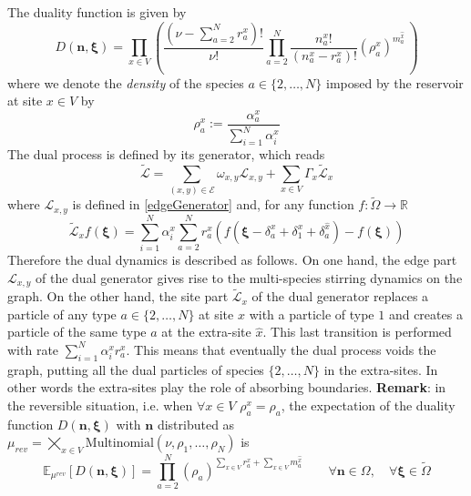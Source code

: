 \documentclass[11pt]{article}
\numberwithin{equation}{section}
\numberwithin{equation}{subsection}
\newcommand{\twoj}{\nu}
\begin{document}
The duality function is given by
\begin{equation}\label{dualityElements}
	D(\bm{n},\bm{\xi})=\prod_{x\in V}\left(\frac{(\nu -\sum_{a=2}^{N}r_{a}^{x})!}{\nu!}\prod_{a=2}^{N}\frac{n_{a}^{x}!}{(n_{a}^{x}-r_{a}^{x})!}\left(\rho_{a}^{x}\right)^{m_{a}^{\widehat{x}}}\,\right)
\end{equation}
where we denote the \textit{density} of the species $a\in \{2,\ldots,N\}$ imposed by the reservoir at site $x\in V$  by 
\begin{equation}
\rho_{a}^{x}:=\frac{\alpha_{a}^{x}}{\sum_{i=1}^{N}\alpha_{i}^{x}}
\end{equation}
The dual process is defined by its generator, which reads
 \begin{equation}\label{DualGenerator}
    \widetilde{\mathcal{L}}=\sum_{(x,y)\in \mathcal{E}}\omega_{x,y}\mathcal{L}_{x,y}+\sum_{x\in V}\Gamma_{x}\widetilde{\mathcal{L}}_{x}
\end{equation}
where 
$\mathcal{L}_{x,y}$ is defined in \eqref{edgeGenerator} and, for any function $f:\widetilde{\Omega}\to \mathbb{R}$ 
\begin{equation}\label{siteDualGenerator}
    \widetilde{\mathcal{L}}_{x}f(\bm{\xi})=\sum_{i=1}^{N}\alpha_{i}^{x}\sum_{a=2}^{N}r_{a}^{x}\left(f(\bm{\xi}-\delta_{a}^{x}+\delta_{1}^{x}+\delta_{a}^{\widehat{x}})-f(\bm{\xi})\right)
\end{equation}
\newline
Therefore the dual dynamics is described as follows. On one hand, the edge part $\mathcal{L}_{x,y}$ of the dual generator gives rise to  the multi-species stirring dynamics on the graph. On the other hand, the site
part $\widetilde{\mathcal{L}}_{x}$ of the dual generator replaces a particle of any type $a\in\{2,\ldots,N\}$ at site $x$ with a particle of type $1$ and creates a particle of the same type $a$ at the extra-site $\widehat{x}$. This last transition is performed with rate $\sum_{i=1}^{N}\alpha_{i}^{x}r_{a}^{x}$. This means that eventually the dual process voids the graph, putting all the dual particles of species $\{2,\ldots,N\}$ in the extra-sites. In other words the extra-sites play the role of absorbing boundaries. 
\newline \newline
\textbf{Remark}: in the reversible situation, i.e. when $\forall x\in V$ $\rho_{a}^{x}=\rho_{a}$, the expectation  of the duality function  $D(\bm{n},\bm{\xi})$ with   $\bm{n}$ distributed as  $\mu_{rev} = \bigtimes_{x\in V}\text{Multinomial}\left(\twoj, \rho_{1},\ldots,\rho_{N}\right)$ is
\begin{equation}
\mathbb{E}_{\mu^{rev}}\left[D(\bm{n},\bm{\xi})\right]=\prod_{a=2}^{N}\left(\rho_{a}\right)^{\sum_{x\in V}r_{a}^{x}+\sum_{x\in V}m_{a}^{\widehat{x}}}\qquad \forall \bm{n}\in \Omega,\quad\forall \bm{\xi}\in \widetilde{\Omega}
\end{equation}
\end{document}
